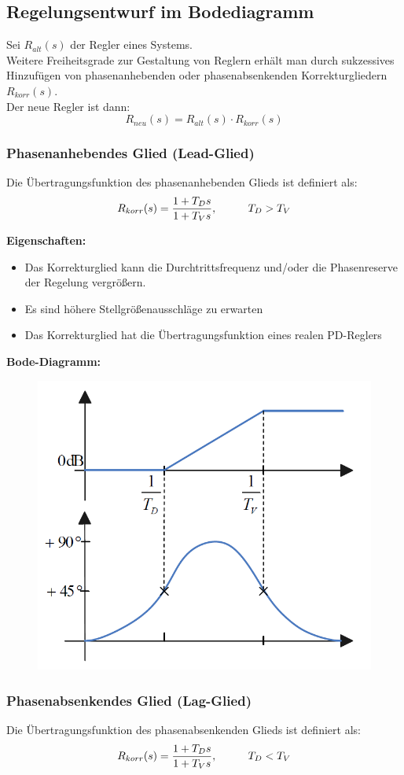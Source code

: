\documentclass[10pt,a4paper]{article}
\newcommand{\tab}[1][1]{\hspace*{#1cm}}
\begin{document}
\subsection{Regelungsentwurf im Bodediagramm}
Sei $R_{alt}(s)$ der Regler eines Systems. \\
Weitere Freiheitsgrade zur Gestaltung von Reglern erhält man durch sukzessives Hinzufügen von phasenanhebenden oder phasenabsenkenden Korrekturgliedern $R_{korr}(s)$. \\
Der neue Regler ist dann:
$$
R_{neu}(s) = R_{alt}(s) ⋅ R_{korr}(s)
$$

\subsubsection{Phasenanhebendes Glied (Lead-Glied)}
Die Übertragungsfunktion des phasenanhebenden Glieds ist definiert als:
$$
	R_{korr}(s) = \frac{1 + T_Ds}{1 + T_Vs}, \tab T_D > T_V
$$

\textbf{Eigenschaften:}
\begin{itemize}
	\item Das Korrekturglied kann die Durchtrittsfrequenz und/oder die Phasenreserve der Regelung vergrößern.
	\item Es sind höhere Stellgrößenausschläge zu erwarten
	\item Das Korrekturglied hat die Übertragungsfunktion eines realen PD-Reglers
\end{itemize}

\textbf{Bode-Diagramm:}
\begin{figure}[H]
	\includegraphics[width = 0.4\columnwidth]{imgs/lead-glied.png}
\end{figure}

\subsubsection{Phasenabsenkendes Glied (Lag-Glied)}
Die Übertragungsfunktion des phasenabsenkenden Glieds ist definiert als:
$$
	R_{korr}(s) = \frac{1 + T_Ds}{1 + T_Vs}, \tab T_D < T_V
$$
\end{document}
